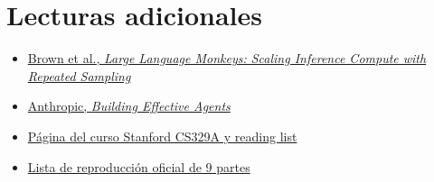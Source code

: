 \section{Lecturas adicionales}

\begin{itemize}
    \item \href{https://arxiv.org/abs/2407.21787}{Brown et al., \emph{Large Language Monkeys: Scaling Inference Compute with Repeated Sampling}}
    \item \href{https://www.anthropic.com/research/building-effective-agents}{Anthropic, \emph{Building Effective Agents}}
    \item \href{https://cs329a.stanford.edu/}{Página del curso Stanford CS329A y reading list}
    \item \href{https://www.youtube.com/playlist?list=PLangBM27OtEA}{Lista de reproducción oficial de 9 partes}
\end{itemize}


